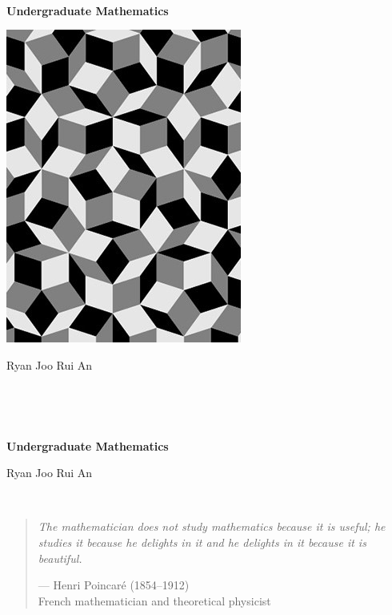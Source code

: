 \begin{center}
\

\vspace{3cm}

{\fontsize{40}{0}\sffamily\bfseries Undergraduate Mathematics}

\vspace{2cm}

\includegraphics[width=0.6\linewidth]{images/penrose-bnw.jpg}

\vspace{2cm}

{\Huge Ryan Joo Rui An}
\nbvspace[1]
\end{center}

\thispagestyle{empty}
\pagebreak

\

\thispagestyle{empty}
\pagebreak

\begin{center}
\

\vspace{6cm}

{\huge\bfseries Undergraduate Mathematics}

\vspace{2cm}

{\huge Ryan Joo Rui An}
\end{center}
\thispagestyle{empty}
\pagebreak

\thispagestyle{empty}
\

\vfill

\begin{quote}
\textit{The mathematician does not study mathematics because it is useful; he studies it because he delights in it and he delights in it because it is beautiful.}

\begin{flushright}--- Henri Poincar\'{e} (1854--1912)\\
French mathematician and theoretical physicist\end{flushright}
\end{quote}

